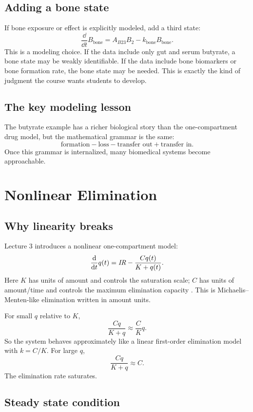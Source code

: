 \documentclass[a4paper]{article}
\newcommand{\ddt}{\frac{\dd}{\dd t}}
\newcommand{\IRate}{\ensuremath{\pksym{IR}}}
\newcommand{\Bone}{B_{\mathrm{bone}}}
\newcommand{\Bblood}{B_2}
\begin{document}
\subsection{Adding a bone state}

If bone exposure or effect is explicitly modeled, add a third state:
\[
  \ddt \Bone=A_{B23}\Bblood-k_{\mathrm{bone}}\Bone.
\]
This is a modeling choice. If the data include only gut and serum butyrate, a bone state may be weakly identifiable. If the data include bone biomarkers or bone formation rate, the bone state may be needed. This is exactly the kind of judgment the course wants students to develop.

\subsection{The key modeling lesson}

The butyrate example has a richer biological story than the one-compartment drug model, but the mathematical grammar is the same:
\[
  \text{formation}
  -
  \text{loss}
  -
  \text{transfer out}
  +
  \text{transfer in}.
\]
Once this grammar is internalized, many biomedical systems become approachable.

\section{Nonlinear Elimination}

\subsection{Why linearity breaks}

Lecture 3 introduces a nonlinear one-compartment model:
\[
  \ddt q(t)=\IRate-\frac{Cq(t)}{K+q(t)}.
\]
Here \(K\) has units of amount and controls the saturation scale; \(C\) has units of amount/time and controls the maximum elimination capacity \cite{bmeg671TranscriptSep032025}. This is Michaelis--Menten-like elimination written in amount units.

For small \(q\) relative to \(K\),
\[
  \frac{Cq}{K+q}
  \approx
  \frac{C}{K}q.
\]
So the system behaves approximately like a linear first-order elimination model with \(k=C/K\). For large \(q\),
\[
  \frac{Cq}{K+q}
  \approx C.
\]
The elimination rate saturates.

\subsection{Steady state condition}
\end{document}
